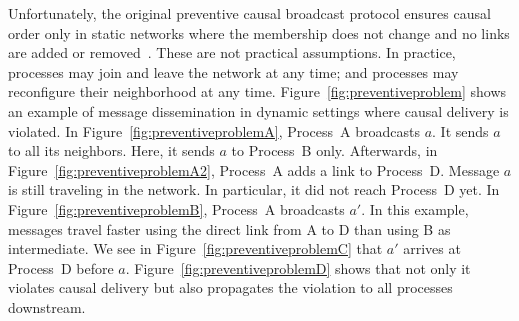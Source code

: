 Unfortunately, the original preventive causal broadcast protocol ensures causal
order only in static networks where the membership does not change and no links
are added or removed~\cite{friedman2004causal}. These are not practical
assumptions.  In practice, processes may join and leave the network at any time;
and processes may reconfigure their neighborhood at any time.
Figure~\ref{fig:preventiveproblem} shows an example of message dissemination in
dynamic settings where causal delivery is violated. In
Figure~\ref{fig:preventiveproblemA}, Process~A broadcasts $a$. It sends $a$ to
all its neighbors. Here, it sends $a$ to Process~B only.  Afterwards, in
Figure~\ref{fig:preventiveproblemA2}, Process~A adds a link to
Process~D. Message $a$ is still traveling in the network. In particular, it did
not reach Process~D yet. In Figure~\ref{fig:preventiveproblemB}, Process~A
broadcasts $a'$. In this example, messages travel faster using the direct link
from A to D than using B as intermediate.  We see in
Figure~\ref{fig:preventiveproblemC} that $a'$ arrives at Process~D before
$a$. Figure~\ref{fig:preventiveproblemD} shows that not only it violates causal
delivery but also propagates the violation to all processes downstream.


%     


